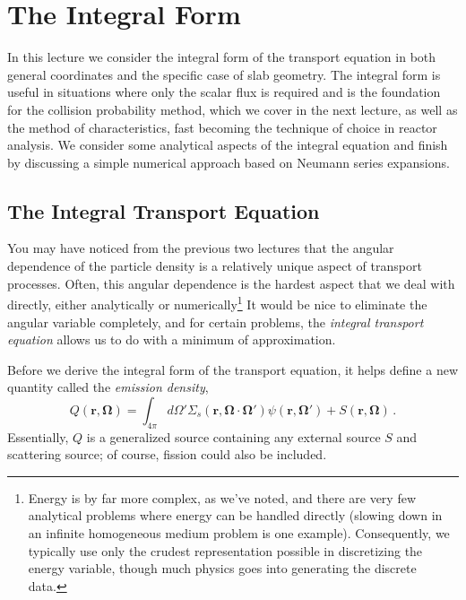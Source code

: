 \chapter{The Integral Form}

In this lecture we consider the integral form of the transport equation in both general coordinates and the specific case of slab geometry.  The integral form is useful in situations where only the scalar flux is required and is the foundation for the collision probability method, which we cover in the next lecture, as well as the method of characteristics, fast becoming the technique of choice in reactor analysis.  We consider some analytical aspects of the integral equation and finish by discussing a simple numerical approach based on Neumann series expansions.

\section*{The Integral Transport Equation}

You may have noticed from the previous two lectures that the angular dependence of the particle density is a relatively unique aspect of transport processes.  Often, this angular dependence is the hardest aspect that we deal with directly, either analytically or numerically\footnote{Energy is by far more complex, as we've noted, and there are very few analytical problems where energy can be handled directly (slowing down in an infinite homogeneous medium problem is one example). Consequently, we typically use only the crudest representation possible in discretizing the energy variable, though much physics goes into generating the discrete data.}  It would be nice to eliminate the angular variable completely, and for certain problems, the \textit{ integral transport equation} allows us to do with a minimum of approximation.

Before we derive the integral form of the transport equation, it helps define a new quantity called the \textit{emission density},
\begin{equation}
  Q(\mathbf{r},\mathbf{\Omega}) = \int_{4\pi} d\Omega' \Sigma_s(\mathbf{r},\mathbf{\Omega}\cdot\mathbf{\Omega}')\psi(\mathbf{r},\mathbf{\Omega'}) + S(\mathbf{r},\mathbf{\Omega}) \, .
  \label{eq:emissiondensity}
\end{equation}
Essentially, $Q$ is a generalized source containing any external source $S$ and scattering source; of course, fission could also be included.

